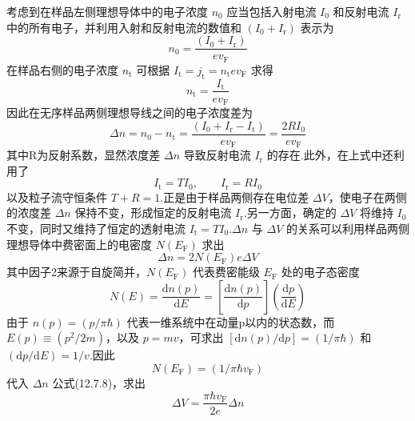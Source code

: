 考虑到在样品左侧理想导体中的电子浓度 $n_{0}$ 应当包括入射电流 $I_{0}$ 和反射电流 $I_{\mathrm{r}}$ 中的所有电子，并利用入射和反射电流的数值和 $\left(I_{0}+I_{\mathrm{r}}\right)$ 表示为
\begin{equation}
  n_{0}=\frac{\left(I_{0}+I_{\mathrm{r}}\right)}{ev_{\mathrm{F}}}
\end{equation}
在样品右侧的电子浓度 $n_{\mathrm{t}}$ 可根据 $I_{\mathrm{t}}=j_{\mathrm{t}}=n_{\mathrm{t}}ev_{\mathrm{F}}$ 求得
\begin{equation}
  n_{\mathrm{t}}=\frac{I_{\mathrm{t}}}{ev_{\mathrm{F}}}
\end{equation}
因此在无序样品两侧理想导线之间的电子浓度差为
\begin{equation}
  \Delta n=n_{0}-n_{\mathrm{t}}=\frac{\left(I_{0}+I_{\mathrm{r}}-I_{\mathrm{t}}\right)}{ev_{\mathrm{F}}}
  =\frac{2RI_{0}}{ev_{\mathrm{F}}}
\end{equation}
其中R为反射系数，显然浓度差 $\Delta n$ 导致反射电流 $I_{\mathrm{r}}$ 的存在.此外，在上式中还利用了
\begin{equation}
  I_{\mathrm{t}}=TI_{0},\qquad I_{\mathrm{r}}=RI_{0}
\end{equation}
以及粒子流守恒条件 $T+R=1$.正是由于样品两侧存在电位差 $\Delta V$，使电子在两侧的浓度差 $\Delta n$ 保持不变，形成恒定的反射电流 $I_{\mathrm{r}}$.另一方面，确定的 $\Delta V$ 将维持 $I_{0}$ 不变，同时又维持了恒定的透射电流 $I_{\mathrm{t}}=TI_{0}$.$\Delta n$ 与 $\Delta V$ 的关系可以利用样品两侧理想导体中费密面上的电密度 $N\left(E_{\mathrm{F}}\right)$ 求出
\begin{equation}
  \Delta n=2N\left(E_{\mathrm{F}}\right)e\Delta V
\end{equation}
其中因子2来源于自旋简并，$N\left(E_{\mathrm{F}}\right)$ 代表费密能级 $E_{\mathrm{F}}$ 处的电子态密度
\begin{equation}
  N\left(E\right)=\frac{\mathrm{d}n\left(p\right)}{\mathrm{d}E}
  =\left[\frac{\mathrm{d}n\left(p\right)}{\mathrm{d}p}\right]\left(\frac{\mathrm{d}p}{\mathrm{d}E}\right)
\end{equation}
由于 $n\left(p\right)=\left(p/\pi\hbar\right)$ 代表一维系统中在动量p以内的状态数，而 $E\left(p\right)\equiv\left(p^{2}/2m\right)$，以及 $p=mv$，可求出 $\left[\mathrm{d}n\left(p\right)/\mathrm{d}p\right]=\left(1/\pi\hbar\right)$ 和 $\left(\mathrm{d}p/\mathrm{d}E\right)=1/v$.因此
\begin{equation}
  N\left(E_{\mathrm{F}}\right)=\left(1/\pi\hbar v_{\mathrm{F}}\right)
\end{equation}
代入 $\Delta n$ 公式(12.7.8)，求出
\begin{equation}
  \Delta V=\frac{\pi\hbar v_{\mathrm{F}}}{2e}\Delta n
\end{equation}
